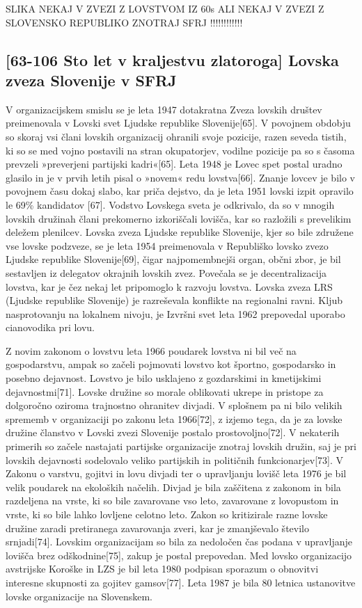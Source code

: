 \documentclass[a4paper,12pt,openright]{book}
\begin{document}
SLIKA NEKAJ V ZVEZI Z LOVSTVOM IZ 60s ALI NEKAJ V ZVEZI Z SLOVENSKO REPUBLIKO ZNOTRAJ SFRJ !!!!!!!!!!!!

\subsection{[63-106 Sto let v kraljestvu zlatoroga] Lovska zveza Slovenije v SFRJ }

V organizacijskem smislu se je leta 1947 dotakratna Zveza lovskih društev preimenovala v Lovski svet Ljudske republike Slovenije[65]. 
V povojnem obdobju so skoraj vsi člani lovskih organizacij ohranili svoje pozicije, razen seveda tistih, ki so se med vojno postavili na stran okupatorjev, vodilne pozicije pa so s časoma prevzeli »preverjeni partijski kadri«[65]. 
Leta 1948 je Lovec spet postal uradno glasilo in je v prvih letih pisal o »novem« redu lovstva[66].
Znanje lovcev je bilo v povojnem času dokaj slabo, kar priča dejstvo, da je leta 1951 lovski izpit opravilo le 69\% kandidatov [67].
Vodstvo Lovskega sveta je odkrivalo, da so v mnogih lovskih družinah člani prekomerno izkoriščali lovišča, kar so razložili s prevelikim deležem plenilcev.
Lovska zveza Ljudske republike Slovenije, kjer so bile združene vse lovske podzveze, se je leta 1954 preimenovala v Republiško lovsko zvezo Ljudske republike Slovenije[69], čigar najpomembnejši organ, občni zbor, je bil sestavljen iz delegatov okrajnih lovskih zvez.
Povečala se je decentralizacija lovstva, kar je čez nekaj let pripomoglo k razvoju lovstva.
Lovska zveza LRS (Ljudske republike Slovenije) je razreševala konflikte na regionalni ravni. 
Kljub nasprotovanju na lokalnem nivoju, je Izvršni svet leta 1962 prepovedal uporabo cianovodika pri lovu. 

Z novim zakonom o lovstvu leta 1966 poudarek lovstva ni bil več na gospodarstvu, ampak so začeli pojmovati lovstvo kot športno, gospodarsko in posebno dejavnost.
Lovstvo je bilo usklajeno z gozdarskimi in kmetijskimi dejavnostmi[71]. 
Lovske družine so morale oblikovati ukrepe in pristope za dolgoročno oziroma trajnostno ohranitev divjadi. 
V splošnem pa ni bilo velikih sprememb v organizaciji po zakonu leta 1966[72], z izjemo tega, da je za lovske družine članstvo v Lovski zvezi Slovenije postalo prostovoljno[72]. V nekaterih primerih so začele nastajati partijske organizacije znotraj lovskih družin, saj je pri lovskih dejavnosti sodelovalo veliko partijskih in političnih funkcionarjev[73].
V Zakonu o varstvu, gojitvi in lovu divjadi ter o upravljanju lovišč leta 1976 je bil velik poudarek na ekoloških načelih. 
Divjad je bila zaščitena z zakonom in bila razdeljena na vrste, ki so bile zavarovane vso leto, zavarovane z lovopustom in vrste, ki so bile lahko lovljene celotno leto. 
Zakon so kritizirale razne lovske družine zaradi pretiranega zavarovanja zveri, kar je zmanjševalo število srnjadi[74].
Lovskim organizacijam so bila za nedoločen čas podana v upravljanje lovišča brez odškodnine[75], zakup je postal prepovedan. 
Med lovsko organizacijo avstrijske Koroške in LZS je bil leta 1980 podpisan sporazum o obnovitvi interesne skupnosti za gojitev gamsov[77].
Leta 1987 je bila 80 letnica ustanovitve lovske organizacije na Slovenskem.  
\end{document}
